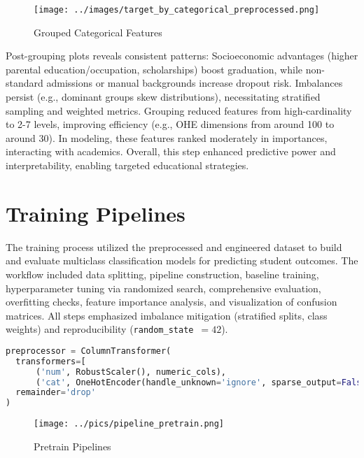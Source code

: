 \documentclass[twoside,final]{hcmut-report}
\begin{document}
\begin{figure}[H]
  \centering
  \texttt{[image: ../images/target\_by\_categorical\_preprocessed.png]}
  \caption{Grouped Categorical Features}
  \label{grouped_cat}
\end{figure}

Post-grouping plots reveals consistent patterns: Socioeconomic advantages (higher parental education/occupation, scholarships) boost graduation, while non-standard admissions or manual backgrounds increase dropout risk. Imbalances persist (e.g., dominant groups skew distributions), necessitating stratified sampling and weighted metrics. Grouping reduced features from high-cardinality to 2-7 levels, improving efficiency (e.g., OHE dimensions from around 100 to around 30). In modeling, these features ranked moderately in importances, interacting with academics. Overall, this step enhanced predictive power and interpretability, enabling targeted educational strategies.

\section{Training Pipelines}
The training process utilized the preprocessed and engineered dataset to build and evaluate multiclass classification models for predicting student outcomes. The workflow included data splitting, pipeline construction, baseline training, hyperparameter tuning via randomized search, comprehensive evaluation, overfitting checks, feature importance analysis, and visualization of confusion matrices. All steps emphasized imbalance mitigation (stratified splits, class weights) and reproducibility (\texttt{random\_state}~$=42$).
\begin{lstlisting}[language=python]
preprocessor = ColumnTransformer(
  transformers=[
      ('num', RobustScaler(), numeric_cols),
      ('cat', OneHotEncoder(handle_unknown='ignore', sparse_output=False), categorical_cols)],
  remainder='drop'
)
\end{lstlisting}
\begin{figure}[H]
  \centering
  \texttt{[image: ../pics/pipeline\_pretrain.png]}
  \caption{Pretrain Pipelines}
  \label{pretrain}
\end{figure}
\end{document}
